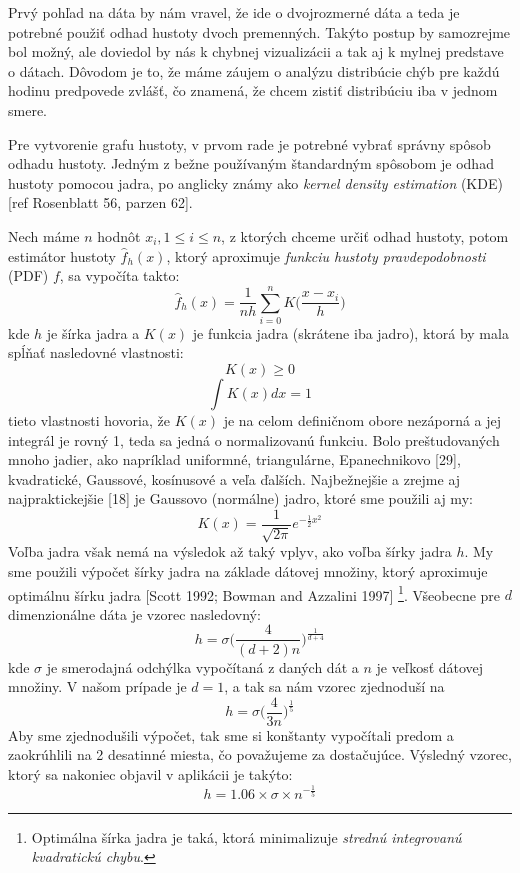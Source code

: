 Prvý pohľad na dáta by nám vravel, že ide o dvojrozmerné dáta a teda je potrebné použiť odhad hustoty dvoch premenných. Takýto postup by samozrejme bol možný, ale doviedol by nás k chybnej vizualizácii a tak aj k mylnej predstave o dátach. Dôvodom je to, že máme záujem o analýzu distribúcie chýb pre každú hodinu predpovede zvlášť, čo znamená, že chcem zistiť distribúciu iba v jednom smere.

Pre vytvorenie grafu hustoty, v prvom rade je potrebné vybrať správny spôsob odhadu hustoty. Jedným z bežne používaným štandardným spôsobom je odhad hustoty pomocou jadra, po anglicky známy ako \textit{kernel density estimation} (KDE) [ref Rosenblatt 56, parzen 62].

Nech máme $ n $ hodnôt $ x_{i}, 1 \leq i \leq n $, z ktorých chceme určiť odhad hustoty, potom estimátor hustoty $ \hat{f}_h(x) $, ktorý aproximuje \textit{funkciu hustoty pravdepodobnosti} (PDF) $ f $, sa vypočíta takto:
\[
	\hat{f}_h(x) = \dfrac{1}{nh} \sum_{i=0}^{n}K\Big(\dfrac{x - x_{i}}{h}\Big)
\]
kde $ h $ je šírka jadra a $ K(x) $ je funkcia jadra (skrátene iba jadro), ktorá by mala spĺňať nasledovné vlastnosti:
\[  K(x) \geq 0 \]
\[  \int K(x) dx = 1 \]
tieto vlastnosti hovoria, že $ K(x) $ je na celom definičnom obore nezáporná a jej integrál je rovný 1, teda sa jedná o normalizovanú funkciu. Bolo preštudovaných mnoho jadier, ako napríklad uniformné, triangulárne, Epanechnikovo [29], kvadratické, Gaussové, kosínusové a veľa ďalších. Najbežnejšie a zrejme aj najpraktickejšie [18] je Gaussovo (normálne) jadro, ktoré sme použili aj my:
\[
	K(x) = \dfrac{1}{\sqrt{2\pi}}e^{-\frac{1}{2}x^2}
\]
Voľba jadra však nemá na výsledok až taký vplyv, ako voľba šírky jadra $ h $. My sme použili výpočet šírky jadra na základe dátovej množiny, ktorý aproximuje optimálnu šírku jadra [Scott 1992; Bowman and Azzalini 1997] \footnote{Optimálna šírka jadra je taká, ktorá minimalizuje \textit{strednú integrovanú kvadratickú chybu}.}. Všeobecne pre $ d $ dimenzionálne dáta je vzorec nasledovný:
\[
	h = \sigma \Big(\frac{4}{(d + 2)n}\Big)^{\frac{1}{d+4}}
\]
kde $ \sigma $ je smerodajná odchýlka vypočítaná z daných dát a $ n $ je veľkosť dátovej množiny. V našom prípade je $ d = 1 $, a tak sa nám vzorec zjednoduší na
\[
	h = \sigma \Big(\dfrac{4}{3n}\Big)^{\frac{1}{5}}
\] 
Aby sme zjednodušili výpočet, tak sme si konštanty vypočítali predom a zaokrúhlili na 2 desatinné miesta, čo považujeme za dostačujúce. Výsledný vzorec, ktorý sa nakoniec objavil v aplikácii je takýto:
\[
	h = 1.06 \times \sigma \times n^{-\frac{1}{5}}
\]

